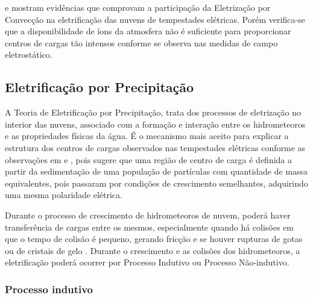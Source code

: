  e  mostram evidências que comprovam a participação da Eletrização por Convecção na eletrificação das nuvens de tempestades elétricas. Porém verifica-se que a disponibilidade de íons da atmosfera não é suficiente para proporcionar centros de cargas tão intensos conforme se observa nas medidas de campo eletrostático. 

\subsection{Eletrificação por Precipitação}

A Teoria de Eletrificação por Precipitação, trata dos processos de eletrização no interior das nuvens, associado com a formação e  interação entre os hidrometeoros e as propriedades físicas da água. É o mecanismo mais aceito para explicar a estrutura dos centros de cargas observados nas tempestades elétricas conforme as observações em  e , pois sugere que uma região de centro de carga é definida a partir da sedimentação de uma população de partículas com quantidade de massa equivalentes, pois passaram por condições de crescimento semelhantes, adquirindo uma mesma polaridade elétrica. 



Durante o processo de crescimento de hidrometeoros de nuvem, poderá haver transferência de cargas entre os mesmos, especialmente quando há colisões em que o tempo de colisão é pequeno, gerando fricção e se houver rupturas de gotas ou de cristais de gelo \cite{Lenard1892, reynolds1957, matthews1964, jonas1968, simpson1909}. Durante o crescimento e as colisões dos hidrometeoros, a eletrificação poderá ocorrer por Processo Indutivo ou Processo Não-indutivo.


\subsubsection{Processo indutivo} 

